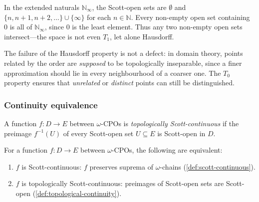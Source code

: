 \begin{example}
\label{ex:scott-separation}
In the extended naturals $\mathbb{N}_\infty$, the Scott-open sets are
$\emptyset$ and $\{n, n{+}1, n{+}2, \ldots\} \cup \{\infty\}$ for each
$n \in \mathbb{N}$. Every non-empty open set containing $0$ is all of
$\mathbb{N}_\infty$, since $0$ is the least element. Thus any two
non-empty open sets intersect---the space is not even $T_1$, let alone
Hausdorff.
\end{example}

The failure of the Hausdorff property is not a defect: in domain theory,
points related by the order are \emph{supposed} to be topologically
inseparable, since a finer approximation should lie in every
neighbourhood of a coarser one. The $T_0$ property ensures that
\emph{unrelated} or \emph{distinct} points can still be distinguished.

\subsubsection*{Continuity equivalence}

\begin{definition}
\label{def:topological-continuity}
A function $f : D \to E$ between $\omega$-CPOs is \emph{topologically
Scott-continuous} if the preimage $f^{-1}(U)$ of every Scott-open set
$U \subseteq E$ is Scott-open in $D$.
\end{definition}

\begin{theorem}
\label{thm:continuity-equiv}
For a function $f : D \to E$ between $\omega$-CPOs, the following are
equivalent:
\begin{enumerate}
  \item $f$ is Scott-continuous: $f$ preserves suprema of
        $\omega$-chains (\cref{def:scott-continuous}).
  \item $f$ is topologically Scott-continuous: preimages of Scott-open
        sets are Scott-open (\cref{def:topological-continuity}).
\end{enumerate}
\end{theorem}

